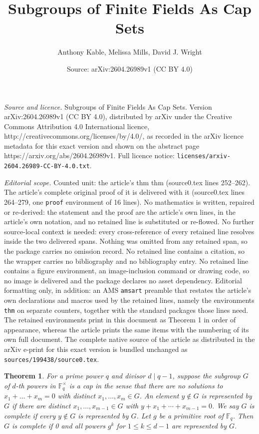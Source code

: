 \documentclass[10pt,a4paper]{amsart}
\title{Subgroups of Finite Fields As Cap Sets}
\author{Anthony Kable, Melissa Mills, David J. Wright}
\date{Source: arXiv:2604.26989v1 (CC BY 4.0)}
\newtheorem{thm}{Theorem}
\begin{document}
\maketitle

\noindent\emph{Source and licence.} Subgroups of Finite Fields As Cap Sets. Version arXiv:2604.26989v1 (CC BY 4.0), distributed by arXiv under the Creative Commons Attribution 4.0 International licence, http://creativecommons.org/licenses/by/4.0/, as recorded in the arXiv licence metadata for this exact version and shown on the abstract page https://arxiv.org/abs/2604.26989v1. Full licence notice: \texttt{licenses/arxiv-2604.26989-CC-BY-4.0.txt}.\par\smallskip

\noindent\textit{Editorial scope.} Counted unit: the article's thm thm (source0.tex lines 252--262). The article's complete original proof of it is delivered with it (source0.tex lines 264--279, one \texttt{proof} environment of 16 lines). No mathematics is written, repaired or re-derived: the statement and the proof are the article's own lines, in the article's own notation, and no retained line is substituted or re-flowed.  No further source-local context is needed: every cross-reference of every retained line resolves inside the two delivered spans.  Nothing was omitted from any retained span, so the package carries no omission record.  No retained line contains a citation, so the wrapper carries no bibliography and no bibliography entry.  No retained line contains a figure environment, an image-inclusion command or drawing code, so no image is delivered and the package declares no asset dependency.  Editorial formatting only, in addition: an AMS \texttt{amsart} preamble that restates the article's own declarations and macros used by the retained lines, namely the environments \texttt{thm} on separate counters, together with the standard packages those lines need.  The retained environments print in this document as Theorem 1 in order of appearance, whereas the article prints the same items with the numbering of its own full document.  The complete native source of the article as distributed in the arXiv e-print for this exact version is bundled unchanged as \texttt{sources/199438/source0.tex}.
\begin{thm}
  For a prime power $q$ and divisor $d\mid q-1$, suppose the subgroup
  $G$ of $d$-th powers in $\mathbb{F}_q^\times$ is a cap in the sense
  that there are no solutions to $x_1+\dots+x_m=0$ with distinct
  $x_1,\dots,x_m\in G$. An element $y\notin G$ is represented by
  $G$ if there are distinct $x_1,\dots,x_{m-1}\in G$ with
  $y+x_1+\dotsb+x_{m-1}=0$. We say $G$ is complete if every
  $y\notin G$ is represented by $G$.  Let $g$ be a primitive root of
  $\mathbb{F}_q$.  Then $G$ is complete if 0 and all powers $g^k$ for
  $1\le k\le d-1$ are represented by $G$.
\end{thm}
\end{document}
